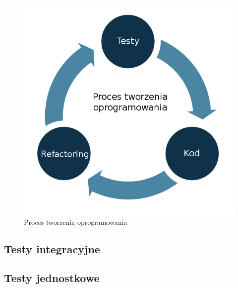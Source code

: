 	\begin{figure}
		\centering
    \includegraphics[scale=0.45]{images/test_cycle.png}
    \caption{Proces tworzenia oprogramowania}
	\end{figure}

	\newpage
  \subsection{Testy integracyjne}
  \subsection{Testy jednostkowe}
